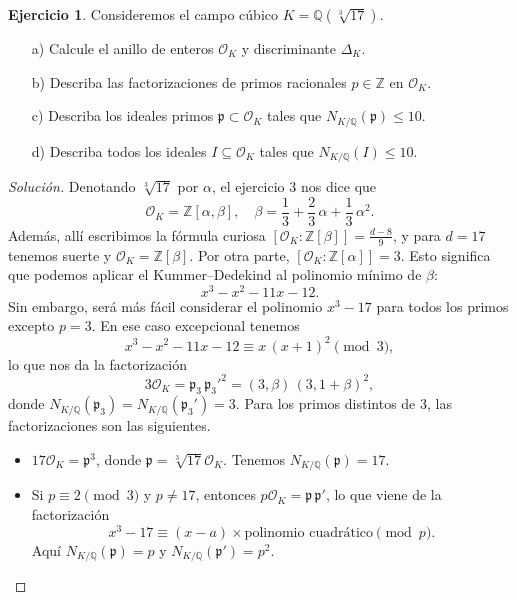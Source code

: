 \documentclass{article}
\newcounter{tarea}
\theoremstyle{definition}
\newtheorem{ejercicio}{Ejercicio}[tarea]
\newenvironment{solucion}{\begin{proof}[Solución]}{\end{proof}}
\newcommand{\ZZ}{\mathbb{Z}}
\newcommand{\QQ}{\mathbb{Q}}
\renewcommand{\O}{\mathcal{O}}
\begin{document}
\begin{ejercicio}
  Consideremos el campo cúbico $K = \QQ (\sqrt[3]{17})$.

  \begin{enumerate}
  \item[a)] Calcule el anillo de enteros $\O_K$ y discriminante $\Delta_K$.
  \item[b)] Describa las factorizaciones de primos racionales $p \in \ZZ$ en
    $\O_K$.
  \item[c)] Describa los ideales primos $\mathfrak{p} \subset \O_K$
    tales que $N_{K/\QQ} (\mathfrak{p}) \le 10$.
  \item[d)] Describa todos los ideales $I \subseteq \O_K$
    tales que $N_{K/\QQ} (I) \le 10$.
  \end{enumerate}

  \ifdefined\solutions
  \begin{solucion}
    Denotando $\sqrt[3]{17}$ por $\alpha$, el ejercicio 3 nos dice que
    \[ \O_K = \ZZ [\alpha,\beta], \quad
       \beta = \frac{1}{3} + \frac{2}{3}\,\alpha + \frac{1}{3}\,\alpha^2. \]
    Además, allí escribimos la fórmula curiosa
    $[\O_K : \ZZ [\beta]] = \frac{d-8}{9}$, y para $d = 17$ tenemos suerte
    y $\O_K = \ZZ [\beta]$. Por otra parte, $[\O_K : \ZZ [\alpha]] = 3$.
    Esto significa que podemos aplicar el Kummer--Dedekind al polinomio mínimo
    de $\beta$:
    $$x^3 - x^2 - 11x - 12.$$
    Sin embargo, será más fácil considerar el polinomio $x^3 - 17$ para todos
    los primos excepto $p = 3$. En ese caso excepcional tenemos
    $$x^3 - x^2 - 11x - 12 \equiv x\,(x + 1)^2 \pmod{3},$$
    lo que nos da la factorización
    $$3\O_K = \mathfrak{p}_3 \, \mathfrak{p}_3'^2 = (3, \beta)\,(3, 1+\beta)^2,$$
    donde $N_{K/\QQ} (\mathfrak{p}_3) = N_{K/\QQ} (\mathfrak{p}_3') = 3$.
    Para los primos distintos de $3$, las factorizaciones son las siguientes.

    \begin{itemize}
    \item $17\O_K = \mathfrak{p}^3$, donde $\mathfrak{p} = \sqrt[3]{17}\O_K$.
      Tenemos $N_{K/\QQ} (\mathfrak{p}) = 17$.

    \item Si $p \equiv 2 \pmod{3}$ y $p \ne 17$, entonces
      $p\O_K = \mathfrak{p} \, \mathfrak{p}'$, lo que viene de la
      factorización
      $$x^3 - 17 \equiv (x-a) \times \text{polinomio cuadrático} \pmod{p}.$$
      Aquí $N_{K/\QQ} (\mathfrak{p}) = p$ y $N_{K/\QQ} (\mathfrak{p}') = p^2$.


\end{itemize}
\end{solucion}
\end{ejercicio}
\end{document}
